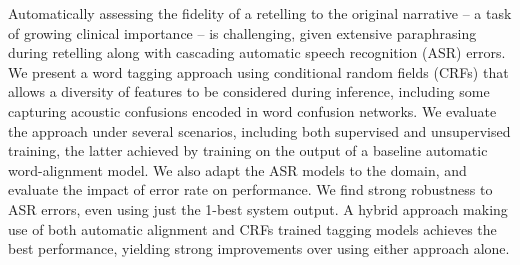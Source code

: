 Automatically assessing the fidelity of a retelling to the original   narrative -- a task of growing clinical importance -- is
   challenging, given extensive paraphrasing during retelling along with
 cascading
   automatic speech recognition (ASR) errors.  We present a word tagging
   approach using conditional random fields (CRFs) that allows a
   diversity of features to be considered during inference, including some
 capturing
   acoustic confusions encoded in word confusion networks.  We evaluate the
   approach under several scenarios, including both supervised and
   unsupervised training, the latter achieved by training on the output
   of a baseline automatic word-alignment model.  We also adapt the ASR
   models to the domain, and evaluate the impact of error rate on
   performance.                                                                       
   We
 find
 strong
 robustness
 to ASR
 errors, even
 using
   just the 1-best system output.  A hybrid approach making use of both
   automatic alignment and CRFs trained tagging models achieves the best
   performance, yielding strong improvements over using either approach
   alone.

